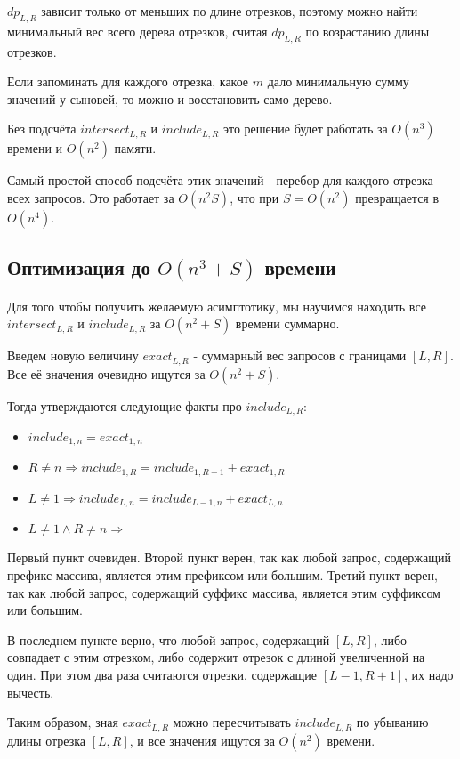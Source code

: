 $dp_{L, R}$ зависит только от меньших по длине отрезков, поэтому можно найти минимальный вес всего дерева отрезков, считая $dp_{L, R}$ по возрастанию длины отрезков.

Если запоминать для каждого отрезка, какое $m$ дало минимальную сумму значений у сыновей, то можно и восстановить само дерево.

Без подсчёта $intersect_{L, R}$ и $include_{L, R}$ это решение будет работать за $O(n^3)$ времени и $O(n^2)$ памяти.

Самый простой способ подсчёта этих значений - перебор для каждого отрезка всех запросов. Это работает за $O(n^2 S)$, что при $S = O(n^2)$ превращается в $O(n^4)$.

\subsection{Оптимизация до $O(n^3 + S)$ времени}

Для того чтобы получить желаемую асимптотику, мы научимся находить все $intersect_{L, R}$ и $include_{L, R}$ за $O(n^2 + S)$ времени суммарно.

Введем новую величину $exact_{L, R}$ - суммарный вес запросов с границами $[L, R]$. Все её значения очевидно ищутся за $O(n^2 + S)$.

Тогда утверждаются следующие факты про $include_{L, R}$:

\begin{itemize}
    \item $include_{1, n} = exact_{1, n}$
    \item $R \ne n \Rightarrow include_{1, R} = include_{1, R + 1} + exact_{1, R}$
    \item $L \ne 1 \Rightarrow include_{L, n} = include_{L - 1, n} + exact_{L, n}$
    \item $L \ne 1 \land R \ne n \Rightarrow$
\end{itemize}

Первый пункт очевиден. Второй пункт верен, так как любой запрос, содержащий префикс массива, является этим префиксом или большим. Третий пункт верен, так как любой запрос, содержащий суффикс массива, является этим суффиксом или большим.

В последнем пункте верно, что любой запрос, содержащий $[L, R]$, либо совпадает с этим отрезком, либо содержит отрезок с длиной увеличенной на один. При этом два раза считаются отрезки, содержащие $[L - 1, R + 1]$, их надо вычесть.

Таким образом, зная $exact_{L, R}$ можно пересчитывать $include_{L, R}$ по убыванию длины отрезка $[L, R]$, и все значения ищутся за $O(n^2)$ времени.

